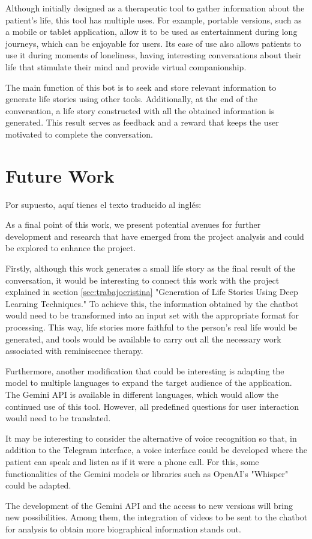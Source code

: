 Although initially designed as a therapeutic tool to gather information about the patient's life, this tool has multiple uses. For example, portable versions, such as a mobile or tablet application, allow it to be used as entertainment during long journeys, which can be enjoyable for users. Its ease of use also allows patients to use it during moments of loneliness, having interesting conversations about their life that stimulate their mind and provide virtual companionship.

The main function of this bot is to seek and store relevant information to generate life stories using other tools. Additionally, at the end of the conversation, a life story constructed with all the obtained information is generated. This result serves as feedback and a reward that keeps the user motivated to complete the conversation.

\section{Future Work}
Por supuesto, aquí tienes el texto traducido al inglés:

As a final point of this work, we present potential avenues for further development and research that have emerged from the project analysis and could be explored to enhance the project.

Firstly, although this work generates a small life story as the final result of the conversation, it would be interesting to connect this work with the project explained in section \ref{sec:trabajocristina} "Generation of Life Stories Using Deep Learning Techniques." To achieve this, the information obtained by the chatbot would need to be transformed into an input set with the appropriate format for processing. This way, life stories more faithful to the person's real life would be generated, and tools would be available to carry out all the necessary work associated with reminiscence therapy.

Furthermore, another modification that could be interesting is adapting the model to multiple languages to expand the target audience of the application. The Gemini API is available in different languages, which would allow the continued use of this tool. However, all predefined questions for user interaction would need to be translated.

It may be interesting to consider the alternative of voice recognition so that, in addition to the Telegram interface, a voice interface could be developed where the patient can speak and listen as if it were a phone call. For this, some functionalities of the Gemini models or libraries such as OpenAI's "Whisper" could be adapted.

The development of the Gemini API and the access to new versions will bring new possibilities. Among them, the integration of videos to be sent to the chatbot for analysis to obtain more biographical information stands out.